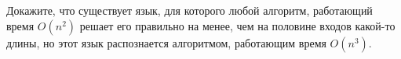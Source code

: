 Докажите, что существует язык, для которого любой алгоритм, работающий время $O(n^2)$ решает его правильно на менее, чем на
половине входов какой-то длины, но этот язык распознается алгоритмом, работающим время $O(n^3)$.